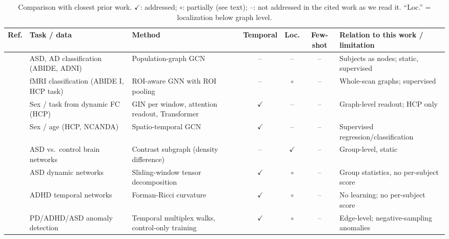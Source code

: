 \documentclass[conference]{IEEEtran}
\newcommand{\ok}{\ensuremath{\checkmark}}
\newcommand{\part}{\ensuremath{\circ}}
\newcommand{\no}{--}
\begin{document}
\begin{table}[!tp]
\caption{Comparison with closest prior work. \ok: addressed; \part: partially (see text); --: not addressed in the cited work as we read it. ``Loc.'' = localization below graph level.}
\label{tab:lit}
\centering\footnotesize
\setlength{\tabcolsep}{3pt}
\begin{tabular}{@{}>{\raggedright\arraybackslash}p{1.0cm}>{\raggedright\arraybackslash}p{3.8cm}>{\raggedright\arraybackslash}p{4.2cm}ccc >{\raggedright\arraybackslash}p{4.2cm}@{}}
\toprule
Ref. & Task / data & Method & Temporal & Loc. & Few-shot & Relation to this work / limitation \\
\midrule
\cite{parisot2018} & ASD, AD classification (ABIDE, ADNI) & Population-graph GCN & \no & \no & \no & Subjects as nodes; static, supervised \\
\cite{li2021braingnn} & fMRI classification (ABIDE I, HCP task) & ROI-aware GNN with ROI pooling & \no & \part & \no & Whole-scan graphs; supervised \\
\cite{kim2021} & Sex / task from dynamic FC (HCP) & GIN per window, attention readout, Transformer & \ok & \no & \no & Graph-level readout; HCP only \\
\cite{gadgil2020} & Sex / age (HCP, NCANDA) & Spatio-temporal GCN & \ok & \no & \no & Supervised regression/classification \\
\cite{lanciano2020} & ASD vs.\ control brain networks & Contrast subgraph (density difference) & \no & \ok & \no & Group-level, static \\
\cite{aggarwal2019} & ASD dynamic networks & Sliding-window tensor decomposition & \ok & \part & \no & Group statistics, no per-subject score \\
\cite{chatterjee2021} & ADHD temporal networks & Forman-Ricci curvature & \ok & \part & \no & No learning; no per-subject score \\
\cite{behrouz2023} & PD/ADHD/ASD anomaly detection & Temporal multiplex walks, control-only training & \ok & \part & \no & Edge-level; negative-sampling anomalies \\

\end{tabular}
\end{table}
\end{document}
